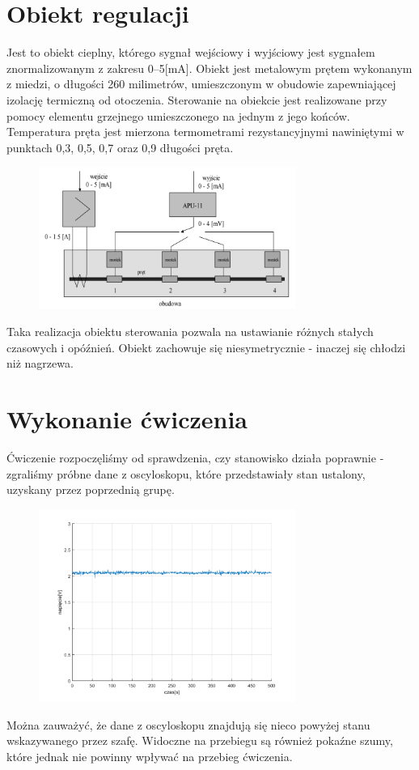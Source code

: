 \documentclass[a4paper, 12pt]{article}
\begin{document}
	\section{Obiekt regulacji}
		Jest to obiekt cieplny, którego sygnał wejściowy i wyjściowy jest sygnałem znormalizowanym z zakresu 0--5[mA]. Obiekt jest metalowym prętem wykonanym z miedzi, o długości 260 milimetrów, umieszczonym w obudowie zapewniającej izolację termiczną od otoczenia. Sterowanie na obiekcie jest realizowane przy pomocy elementu grzejnego umieszczonego na jednym z jego końców. Temperatura pręta jest mierzona termometrami rezystancyjnymi nawiniętymi w punktach 0,3, 0,5, 0,7 oraz 0,9 długości pręta.
		\begin{figure}[H]
			\centering
			\includegraphics[width=0.75\textwidth]{./img/obiekt.png}
		\end{figure}
		Taka realizacja obiektu sterowania pozwala na ustawianie różnych stałych czasowych i opóźnień. Obiekt zachowuje się niesymetrycznie - inaczej się chłodzi niż nagrzewa.
	\section{Wykonanie ćwiczenia}
		Ćwiczenie rozpoczęliśmy od sprawdzenia, czy stanowisko działa poprawnie - zgraliśmy próbne dane z oscyloskopu, które przedstawiały stan ustalony, uzyskany przez poprzednią grupę.
		\begin{figure}[H]
			\centering
			\includegraphics[width=0.75\textwidth]{./img/nothing.png}
		\end{figure}
		Można zauważyć, że dane z oscyloskopu znajdują się nieco powyżej stanu wskazywanego przez szafę. Widoczne na przebiegu są również pokaźne szumy, które jednak nie powinny wpływać na przebieg ćwiczenia.
\end{document}
